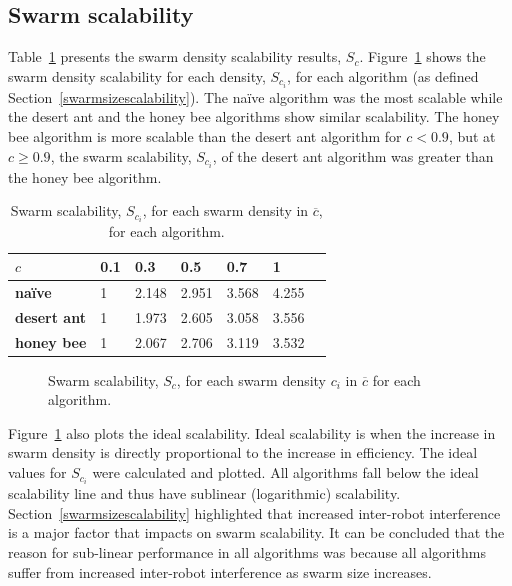\subsection{Swarm scalability}
\label{results:swarmscalability}

Table~\ref{table:swarmscalability} presents the swarm density scalability results, $S_c$. Figure~\ref{fig:swarmscalability} shows the swarm density scalability for each density, $S_{c_i}$, for each algorithm (as defined Section~\ref{swarmsizescalability}). The na\"ive algorithm was the most scalable while the desert ant and the honey bee algorithms show similar scalability. The honey bee algorithm is more scalable than the desert ant algorithm for $c < 0.9$, but at $c \geq 0.9$, the swarm scalability, $S_{c_i}$, of the desert ant algorithm was greater than the honey bee algorithm.

\begin{table}[!htbp]
\centering
\caption{Swarm scalability, $S_{c_i}$, for each swarm density in $\overline{c}$, for each algorithm.}
\label{table:swarmscalability}
\begin{tabular}{@{}lllllll@{}}
\toprule
\textbf{$c$}            & \textbf{0.1} & \textbf{0.3}         & \textbf{0.5}         & \textbf{0.7}         & \textbf{1}           \\ \midrule
\textbf{na\"ive}    & 1   & 2.148 & 2.951  & 3.568 & 4.255  \\
\textbf{desert ant} & 1   & 1.973 & 2.605 & 3.058  & 3.556 \\
\textbf{honey bee}  & 1   & 2.067 & 2.706 & 3.119 & 3.532 \\ \bottomrule
\end{tabular}
\end{table}

\begin{figure}[!htbp]
\centering
\small
\resizebox{\textwidth}{!}{}
\caption{Swarm scalability, $S_c$, for each swarm density $c_i$ in $\overline{c}$ for each algorithm.}
\label{fig:swarmscalability}
\end{figure}

Figure~\ref{fig:swarmscalability} also plots the ideal scalability. Ideal scalability is when the increase in swarm density is directly proportional to the increase in efficiency. The ideal values for $S_{c_i}$ were calculated and plotted. All algorithms fall below the ideal scalability line and thus have sublinear (logarithmic) scalability. Section~\ref{swarmsizescalability} highlighted that increased inter-robot interference is a major factor that impacts on swarm scalability. It can be concluded that the reason for sub-linear performance in all algorithms was because all algorithms suffer from increased inter-robot interference as swarm size increases.


